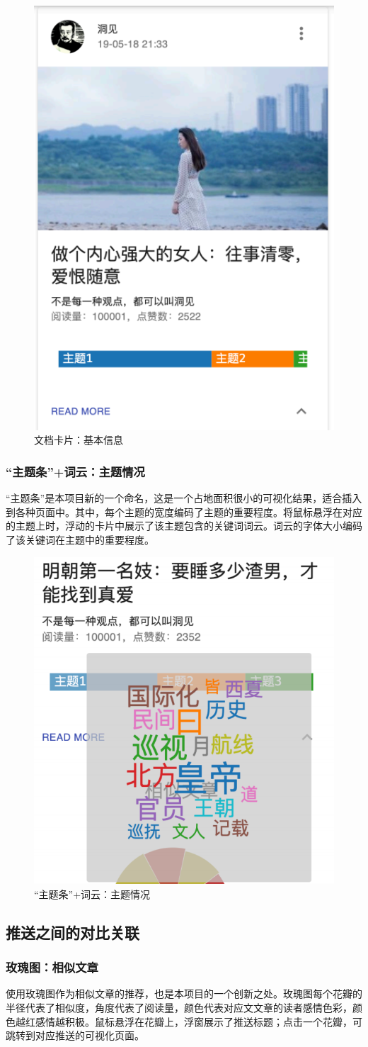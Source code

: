 \documentclass[a4paper,12pt]{article}
\begin{document}
    \begin{figure}
      \centering
      \includegraphics[width=0.3\linewidth]{wdkp.png}
      \caption{文档卡片：基本信息}
      \label{fig:wdkp}
    \end{figure}
    \subsubsection{“主题条”+词云：主题情况}
    “主题条”是本项目新的一个命名，这是一个占地面积很小的可视化结果，适合插入到各种页面中。其中，每个主题的宽度编码了主题的重要程度。将鼠标悬浮在对应的主题上时，浮动的卡片中展示了该主题包含的关键词词云。词云的字体大小编码了该关键词在主题中的重要程度。

    \begin{figure}
      \centering
      \includegraphics[width=0.5\linewidth]{ztt.png}
      \caption{“主题条”+词云：主题情况}
      \label{fig:ztt}
    \end{figure}
    \subsection{推送之间的对比关联}
    \subsubsection{玫瑰图：相似文章}
    使用玫瑰图作为相似文章的推荐，也是本项目的一个创新之处。玫瑰图每个花瓣的半径代表了相似度，角度代表了阅读量，颜色代表对应⽂文章的读者感情色彩，颜色越红感情越积极。鼠标悬浮在花瓣上，浮窗展示了推送标题；点击一个花瓣，可跳转到对应推送的可视化页面。
\end{document}
